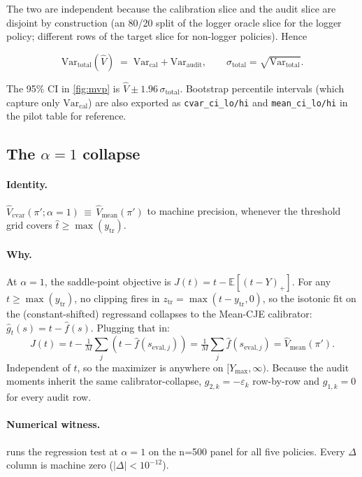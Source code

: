 \documentclass[11pt]{article}
\newcommand{\E}{\mathbb{E}}
\newcommand{\Var}{\mathrm{Var}}
\begin{document}
The two are independent because the calibration slice and the audit
slice are disjoint by construction (an 80/20 split of the logger
oracle slice for the logger policy; different rows of the target
slice for non-logger policies). Hence

\begin{equation}
\Var_{\mathrm{total}}(\widehat{V}) \;=\; \Var_{\mathrm{cal}} + \Var_{\mathrm{audit}},
\qquad
\sigma_{\mathrm{total}} = \sqrt{\Var_{\mathrm{total}}}.
\label{eq:vartotal}
\end{equation}

The 95\% CI in \cref{fig:mvp} is $\widehat{V} \pm 1.96\,\sigma_{\mathrm{total}}$.
Bootstrap percentile intervals (which capture only $\Var_{\mathrm{cal}}$)
are also exported as \texttt{cvar\_ci\_lo/hi} and \texttt{mean\_ci\_lo/hi}
in the pilot table for reference.

\subsection{The $\alpha = 1$ collapse}
\label{app:alpha1}

\paragraph{Identity.}
$\widehat{V}_{\mathrm{cvar}}(\pi'; \alpha = 1) \,\equiv\, \widehat{V}_{\mathrm{mean}}(\pi')$
to machine precision, whenever the threshold grid covers
$\hat t \ge \max(y_{\mathrm{tr}})$.

\paragraph{Why.}
At $\alpha = 1$, the saddle-point objective is
$J(t) = t - \E[(t-Y)_+]$. For any $t \ge \max(y_{\mathrm{tr}})$,
no clipping fires in $z_{\mathrm{tr}} = \max(t - y_{\mathrm{tr}}, 0)$,
so the isotonic fit on the (constant-shifted) regressand collapses
to the Mean-CJE calibrator: $\hat g_t(s) = t - \hat f(s)$. Plugging
that in:
\[
J(t) = t - \tfrac{1}{M} \sum_{j} (t - \hat f(s_{\mathrm{eval},j}))
     = \tfrac{1}{M} \sum_{j} \hat f(s_{\mathrm{eval},j})
     = \widehat{V}_{\mathrm{mean}}(\pi').
\]
Independent of $t$, so the maximizer is anywhere on $[Y_{\max}, \infty)$.
Because the audit moments inherit the same calibrator-collapse,
$g_{2,k} = -\varepsilon_k$ row-by-row and $g_{1,k} = 0$ for every
audit row.

\paragraph{Numerical witness.}
 runs the regression test at $\alpha = 1$ on
the n=500 panel for all five policies. Every $\Delta$ column is
machine zero ($|\Delta| < 10^{-12}$).
\end{document}
